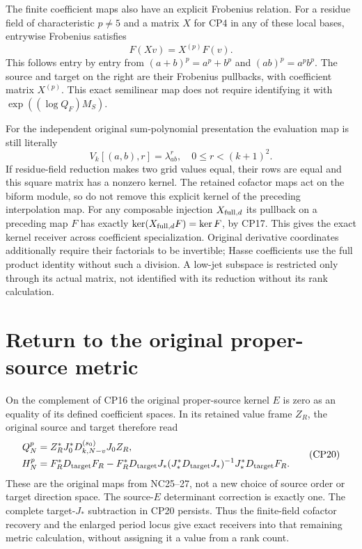 The finite coefficient maps also have an explicit Frobenius relation.
For a residue field of characteristic $p\ne5$ and a matrix $X$
for CP4 in any of these local bases, entrywise Frobenius satisfies
\[
 F(Xv)=X^{(p)}F(v).                                               \tag{CP18}
\]
This follows entry by entry from $(a+b)^p=a^p+b^p$ and
$(ab)^p=a^pb^p$. The source and target on the right are their
Frobenius pullbacks, with coefficient matrix $X^{(p)}$.
This exact semilinear map does not require identifying it with
$\exp((\log Q_F)M_S)$.

For the independent original sum-polynomial presentation the
evaluation map is still literally
\[
 V_k[(a,b),r]=\lambda_{ab}^{r},\quad0\le r<(k+1)^2.              \tag{CP19}
\]
If residue-field reduction makes two grid values equal, their rows
are equal and this square matrix has a nonzero kernel. The retained
cofactor maps act on the biform module, so do not remove this
explicit kernel of the preceding interpolation map. For any
composable injection $X_{{\rm full},d}$ its pullback on a preceding
map $F$ has exactly $\ker(X_{{\rm full},d}F)=\ker F$, by CP17.
This gives the exact kernel receiver across coefficient specialization.
Original derivative coordinates additionally require their factorials
to be invertible; Hasse coefficients use the full product identity
without such a division. A low-jet subspace is restricted only through
its actual matrix, not identified with its reduction without its
rank calculation.

\section{Return to the original proper-source metric}
On the complement of CP16 the original proper-source kernel $E$ is
zero as an equality of its defined coefficient spaces. In its retained
value frame $Z_R$, the original source and target therefore read
\[
 \begin{split}
 Q_N^p&=Z_R^*J_0^*D_{k,N-v}^{(s_0)}J_0Z_R,\\
 H_N^p&=F_R^*D_{\rm target}F_R
  -F_R^*D_{\rm target}J_*
   (J_*^*D_{\rm target}J_*)^{-1}J_*^*D_{\rm target}F_R.
 \end{split}                                                       \tag{CP20}
\]
These are the original maps from NC25--27, not a new choice of
source order or target direction space. The source-$E$ determinant
correction is exactly one. The complete target-$J_*$ subtraction
in CP20 persists. Thus the finite-field cofactor recovery and the
enlarged period locus give exact receivers into that remaining
metric calculation, without assigning it a value from a rank count.

